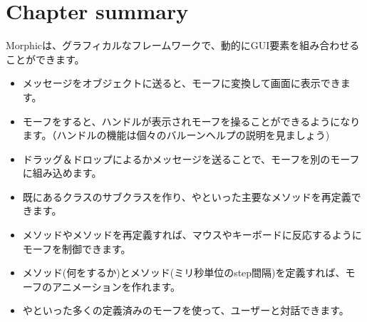\documentclass[a4paper,10pt,twoside]{book}
\begin{document}




\section{Chapter summary}

Morphicは、グラフィカルなフレームワークで、動的にGUI要素を組み合わせることができます。

\begin{itemize}
  \item {}メッセージをオブジェクトに送ると、モーフに変換して画面に表示できます。
  \item モーフを\metaclick すると、ハンドルが表示されモーフを操ることができるようになります。（ハンドルの機能は個々のバルーンヘルプの説明を見ましょう)
  \item ドラッグ＆ドロップによるかメッセージを送ることで、モーフを別のモーフに組み込めます。
  \item 既にあるクラスのサブクラスを作り、やといった主要なメソッドを再定義できます。
  \item {}メソッドやメソッド\etc を再定義すれば、マウスやキーボードに反応するようにモーフを制御できます。
  \item {}メソッド(何をするか)とメソッド(ミリ秒単位のstep間隔)を定義すれば、モーフのアニメーションを作れます。
  \item {}やといった多くの定義済みのモーフを使って、ユーザーと対話できます。
\end{itemize}

\ifx\wholebook\relax\else
\end{document}

